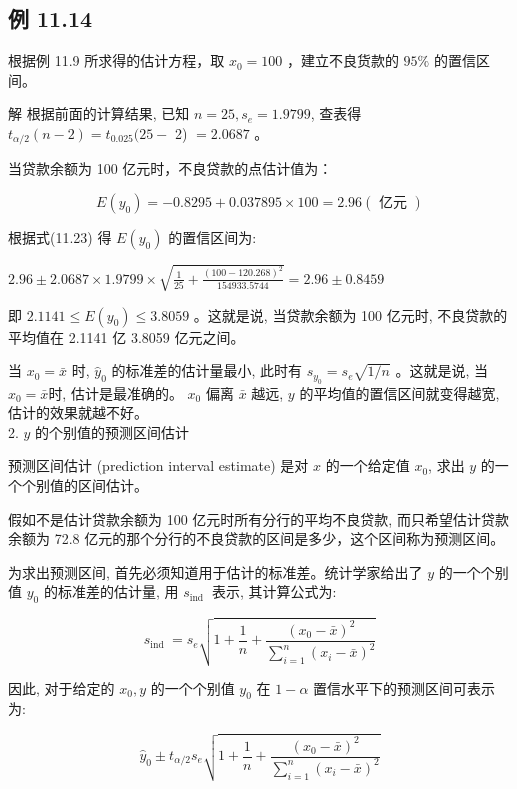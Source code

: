 \documentclass[10pt]{article}
\begin{document}
\begin{CJK*}{UTF8}{bsmi}
\section*{例 11.14}
根据例 11.9 所求得的估计方程，取 $x_{0}=100$ ，建立不良货款的 $95 \%$ 的置信区间。

解 根据前面的计算结果, 已知 $n=25, s_{e}=1.9799$, 查表得 $t_{\alpha / 2}(n-2)=t_{0.025}(25-$ 2) $=2.0687$ 。

当贷款余额为 100 亿元时，不良贷款的点估计值为：

$$
E\left(y_{0}\right)=-0.8295+0.037895 \times 100=2.96(\text { 亿元 })
$$

根据式(11.23) 得 $E\left(y_{0}\right)$ 的置信区间为:

$2.96 \pm 2.0687 \times 1.9799 \times \sqrt{\frac{1}{25}+\frac{(100-120.268)^{2}}{154933.5744}}=2.96 \pm 0.8459$

即 $2.1141 \leqslant E\left(y_{0}\right) \leqslant 3.8059$ 。这就是说, 当贷款余额为 100 亿元时, 不良贷款的平均值在 2.1141 亿 3.8059 亿元之间。

当 $x_{0}=\bar{x}$ 时, $\hat{y}_{0}$ 的标准差的估计量最小, 此时有 $s_{y_{0}}=s_{e} \sqrt{1 / n}$ 。这就是说, 当 $x_{0}=\bar{x}$时, 估计是最准确的。 $x_{0}$ 偏离 $\bar{x}$ 越远, $y$ 的平均值的置信区间就变得越宽, 估计的效果就越不好。\\
2. $y$ 的个别值的预测区间估计

预测区间估计 (prediction interval estimate) 是对 $x$ 的一个给定值 $x_{0}$, 求出 $y$ 的一个个别值的区间估计。

假如不是估计贷款余额为 100 亿元时所有分行的平均不良贷款, 而只希望估计贷款余额为 72.8 亿元的那个分行的不良贷款的区间是多少，这个区间称为预测区间。

为求出预测区间, 首先必须知道用于估计的标准差。统计学家给出了 $y$ 的一个个别值 $y_{0}$ 的标准差的估计量, 用 $s_{\text {ind }}$ 表示, 其计算公式为:


\begin{equation*}
s_{\text {ind }}=s_{e} \sqrt{1+\frac{1}{n}+\frac{\left(x_{0}-\bar{x}\right)^{2}}{\sum_{i=1}^{n}\left(x_{i}-\bar{x}\right)^{2}}} \tag{11.24}
\end{equation*}


因此, 对于给定的 $x_{0}, y$ 的一个个别值 $y_{0}$ 在 $1-\alpha$ 置信水平下的预测区间可表示为:


\begin{equation*}
\hat{y}_{0} \pm t_{\alpha / 2} s_{e} \sqrt{1+\frac{1}{n}+\frac{\left(x_{0}-\bar{x}\right)^{2}}{\sum_{i=1}^{n}\left(x_{i}-\bar{x}\right)^{2}}} \tag{11.25}
\end{equation*}



\end{CJK*}
\end{document}
